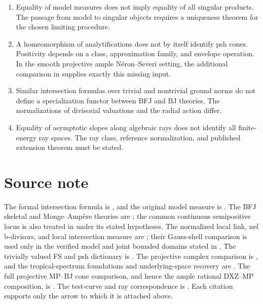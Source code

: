 \begin{enumerate}
\item Equality of model measures does not imply equality of all singular
products.
The passage from model to singular objects requires a uniqueness theorem for
the chosen limiting procedure.

\item A homeomorphism of analytifications does not by itself identify psh
cones.  Positivity depends on a class, approximation family, and envelope
operation.  In the smooth projective ample N\'eron--Severi setting, the
additional comparison in  supplies
exactly this missing input.

\item Similar intersection formulas over trivial and nontrivial ground
norms do not define a specialization functor between BFJ and BJ theories.
The normalizations of divisorial valuations and the radial action differ.

\item Equality of asymptotic slopes along algebraic rays does not identify
all finite-energy ray spaces.
The ray class, reference normalization, and published extension theorem must
be stated.
\end{enumerate}

\section*{Source note}
\label{sec:dict-source-note}

The formal intersection formula is
\cite[Theorem~18.5.5 and Proposition~18.5.8]{CLD25}, and the original
model measure is \cite{CL06}.
The BFJ skeletal and Monge--Amp\`ere theories are
\cite{BFJ16,BFJ15}; the common continuous semipositive locus is also treated
in \cite{BE21} under its stated hypotheses.
The normalized local link, nef b-divisors, and local intersection measure are
\cite{BFJ08}; their Gauss-shell comparison is used only in the verified
model and joint bounded domains stated in .
The trivially valued FS and psh dictionary is \cite{BJ22}.
The projective complex comparison is \cite{DXZ23}, and the tropical-spectrum
foundations and underlying-space recovery are \cite{MP24}.
The full projective MP--BJ cone comparison, and hence the ample rational
DXZ--MP composition, is .
The test-curve and ray correspondence is \cite{RWN14}.
Each citation supports only the arrow to which it is attached above.
